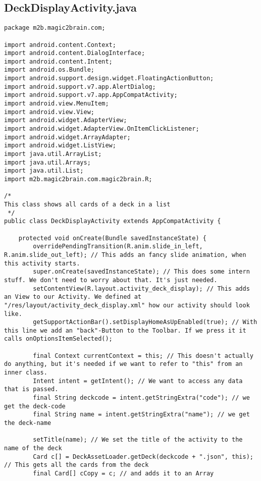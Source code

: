 \subsection{DeckDisplayActivity.java}
\begin{lstlisting}
package m2b.magic2brain.com;

import android.content.Context;
import android.content.DialogInterface;
import android.content.Intent;
import android.os.Bundle;
import android.support.design.widget.FloatingActionButton;
import android.support.v7.app.AlertDialog;
import android.support.v7.app.AppCompatActivity;
import android.view.MenuItem;
import android.view.View;
import android.widget.AdapterView;
import android.widget.AdapterView.OnItemClickListener;
import android.widget.ArrayAdapter;
import android.widget.ListView;
import java.util.ArrayList;
import java.util.Arrays;
import java.util.List;
import m2b.magic2brain.com.magic2brain.R;

/*
This class shows all cards of a deck in a list
 */
public class DeckDisplayActivity extends AppCompatActivity {

    protected void onCreate(Bundle savedInstanceState) {
        overridePendingTransition(R.anim.slide_in_left, R.anim.slide_out_left); // This adds an fancy slide animation, when this activity starts.
        super.onCreate(savedInstanceState); // This does some intern stuff. We don't need to worry about that. It's just needed.
        setContentView(R.layout.activity_deck_display); // This adds an View to our Activity. We defined at "/res/layout/activity_deck_display.xml" how our activity should look like.
        getSupportActionBar().setDisplayHomeAsUpEnabled(true); // With this line we add an "back"-Button to the Toolbar. If we press it it calls onOptionsItemSelected();

        final Context currentContext = this; // This doesn't actually do anything, but it's needed if we want to refer to "this" from an inner class.
        Intent intent = getIntent(); // We want to access any data that is passed.
        final String deckcode = intent.getStringExtra("code"); // we get the deck-code
        final String name = intent.getStringExtra("name"); // we get the deck-name

        setTitle(name); // We set the title of the activity to the name of the deck
        Card c[] = DeckAssetLoader.getDeck(deckcode + ".json", this); // This gets all the cards from the deck
        final Card[] cCopy = c; // and adds it to an Array


\end{lstlisting}
